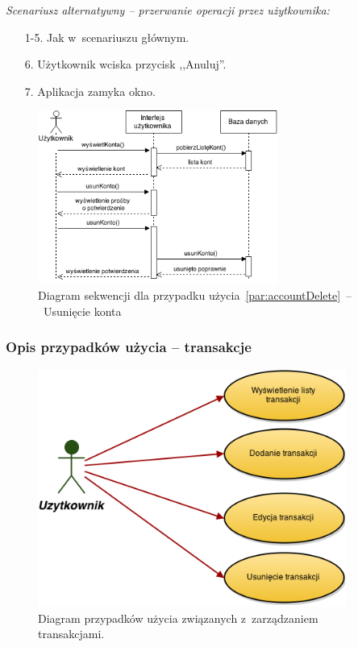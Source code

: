 \noindent \textit{Scenariusz alternatywny -- przerwanie operacji przez użytkownika:}
\begin{enumerate}
  \item[1-5.] Jak w~scenariuszu głównym.
  \item[6.] Użytkownik wciska przycisk ,,Anuluj''.
  \item[7.] Aplikacja zamyka okno.
\end{enumerate}

\begin{figure}[H]
  \centering
  \includegraphics[width=0.7\textwidth]{images/sequence-diagram-account-delete.png}
  \caption{Diagram sekwencji dla przypadku użycia~\ref{par:accountDelete}~--~Usunięcie konta}
\end{figure}

\subsubsection{Opis przypadków użycia -- transakcje}

\begin{figure}[H]
  \centering
  \includegraphics[width=0.9\textwidth]{images/transactions_use_cases.png}
  \caption{Diagram przypadków użycia związanych z~zarządzaniem transakcjami.}
\end{figure}

